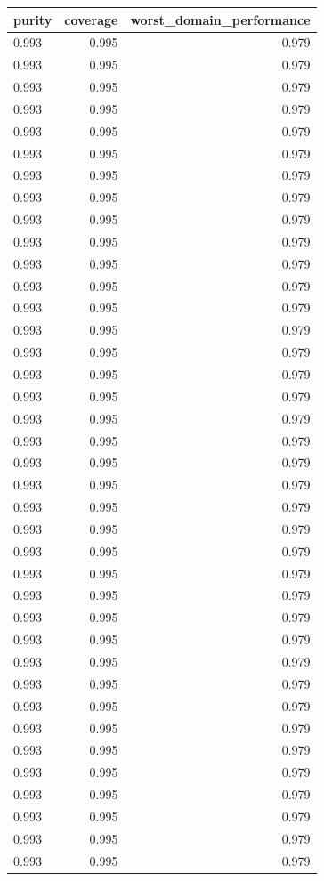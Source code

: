 \begin{tabular}{lrr}
\toprule
purity & coverage & worst_domain_performance \\
\midrule
0.993 & 0.995 & 0.979 \\
0.993 & 0.995 & 0.979 \\
0.993 & 0.995 & 0.979 \\
0.993 & 0.995 & 0.979 \\
0.993 & 0.995 & 0.979 \\
0.993 & 0.995 & 0.979 \\
0.993 & 0.995 & 0.979 \\
0.993 & 0.995 & 0.979 \\
0.993 & 0.995 & 0.979 \\
0.993 & 0.995 & 0.979 \\
0.993 & 0.995 & 0.979 \\
0.993 & 0.995 & 0.979 \\
0.993 & 0.995 & 0.979 \\
0.993 & 0.995 & 0.979 \\
0.993 & 0.995 & 0.979 \\
0.993 & 0.995 & 0.979 \\
0.993 & 0.995 & 0.979 \\
0.993 & 0.995 & 0.979 \\
0.993 & 0.995 & 0.979 \\
0.993 & 0.995 & 0.979 \\
0.993 & 0.995 & 0.979 \\
0.993 & 0.995 & 0.979 \\
0.993 & 0.995 & 0.979 \\
0.993 & 0.995 & 0.979 \\
0.993 & 0.995 & 0.979 \\
0.993 & 0.995 & 0.979 \\
0.993 & 0.995 & 0.979 \\
0.993 & 0.995 & 0.979 \\
0.993 & 0.995 & 0.979 \\
0.993 & 0.995 & 0.979 \\
0.993 & 0.995 & 0.979 \\
0.993 & 0.995 & 0.979 \\
0.993 & 0.995 & 0.979 \\
0.993 & 0.995 & 0.979 \\
0.993 & 0.995 & 0.979 \\
0.993 & 0.995 & 0.979 \\
0.993 & 0.995 & 0.979 \\
0.993 & 0.995 & 0.979 \\

\end{tabular}
